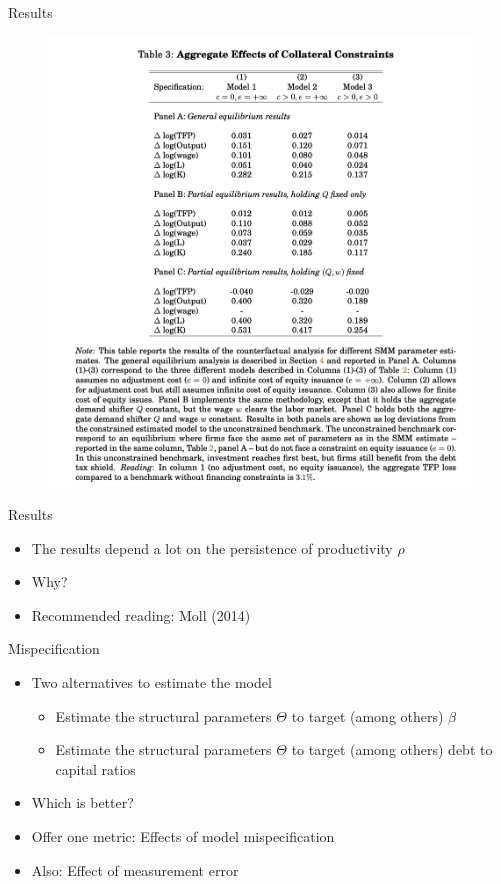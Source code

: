 \documentclass[english,xcolor=svgnames]{beamer}
\begin{document}
\begin{frame}{Results}
\begin{figure}
\includegraphics[scale=0.35]{figures/cchst_3}
\end{figure}
\end{frame}

\begin{frame}{Results}
\begin{itemize}
\item The results depend a lot on the persistence of productivity $\rho$
\item Why?
\item Recommended reading: Moll (2014)
\end{itemize}
\end{frame}

\begin{frame}{Mispecification}
\begin{itemize}
\item Two alternatives to estimate the model
\begin{itemize}
\item Estimate the structural parameters $\Theta$ to target (among others) $\beta$
\item Estimate the structural parameters $\Theta$ to target (among others) debt to capital ratios
\end{itemize}
\item Which is better?
\item Offer one metric: Effects of model mispecification
\item Also: Effect of measurement error
\end{itemize}
\end{frame}
\end{document}
